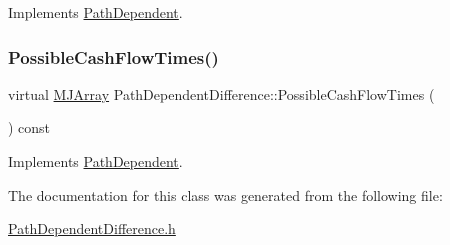 Implements \hyperlink{classPathDependent_a1ee091a4f3680339683af087dfb4ca0f}{Path\+Dependent}.

\hypertarget{classPathDependentDifference_a70cb4e639817e4d4ad5ace6212c5eec9}{}\label{classPathDependentDifference_a70cb4e639817e4d4ad5ace6212c5eec9} 
\subsubsection{\texorpdfstring{Possible\+Cash\+Flow\+Times()}{PossibleCashFlowTimes()}}
{\footnotesize\ttfamily virtual \hyperlink{classMJArray}{M\+J\+Array} Path\+Dependent\+Difference\+::\+Possible\+Cash\+Flow\+Times (\begin{DoxyParamCaption}{ }\end{DoxyParamCaption}) const\hspace{0.3cm}{\ttfamily [virtual]}}



Implements \hyperlink{classPathDependent_a4c8bf82be7f4443c5c8177d7500d542d}{Path\+Dependent}.



The documentation for this class was generated from the following file\+:\begin{DoxyCompactItemize}
\item 
\hyperlink{PathDependentDifference_8h}{Path\+Dependent\+Difference.\+h}\end{DoxyCompactItemize}
